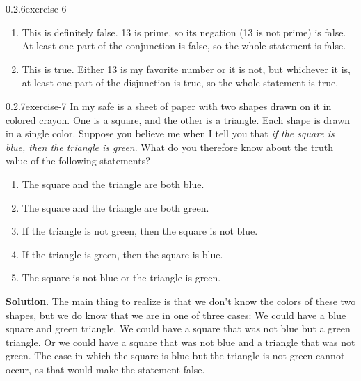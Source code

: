 \documentclass[twoside,11pt,]{book}
\numberwithin{equation}{chapter}
\begin{document}
\begin{divisionsolution}{0.2.6}{}{exercise-6}
\begin{enumerate}[label=(\alph*)]
We cannot tell. The statement would be true if 13 is my favorite number, and false if not (since a conjunction needs both parts to be true to be true).%
\item\hypertarget{li-167}{}\hypertarget{p-203}{}%
This is definitely false. 13 is prime, so its negation (13 is not prime) is false. At least one part of the conjunction is false, so the whole statement is false.%
\item\hypertarget{li-168}{}\hypertarget{p-204}{}%
This is true. Either 13 is my favorite number or it is not, but whichever it is, at least one part of the disjunction is true, so the whole statement is true.%
\end{enumerate}
%
\end{divisionsolution}%
\begin{divisionsolution}{0.2.7}{}{exercise-7}%
\hypertarget{p-217}{}%
In my safe is a sheet of paper with two shapes drawn on it in colored crayon. One is a square, and the other is a triangle. Each shape is drawn in a single color. Suppose you believe me when I tell you that \emph{if the square is blue, then the triangle is green}. What do you therefore know about the truth value of the following statements?\leavevmode%
\begin{enumerate}[label=(\alph*)]
\item\hypertarget{li-179}{}\hypertarget{p-218}{}%
The square and the triangle are both blue. %
\item\hypertarget{li-184}{}\hypertarget{p-219}{}%
The square and the triangle are both green. %
\item\hypertarget{li-189}{}\hypertarget{p-220}{}%
If the triangle is not green, then the square is not blue. %
\item\hypertarget{li-194}{}\hypertarget{p-221}{}%
If the triangle is green, then the square is blue. %
\item\hypertarget{li-199}{}\hypertarget{p-222}{}%
The square is not blue or the triangle is green. %
\end{enumerate}
%
\par\smallskip%
\noindent\textbf{Solution}.\quad%
\hypertarget{p-223}{}%
The main thing to realize is that we don't know the colors of these two shapes, but we do know that we are in one of three cases: We could have a blue square and green triangle. We could have a square that was not blue but a green triangle. Or we could have a square that was not blue and a triangle that was not green. The case in which the square is blue but the triangle is not green cannot occur, as that would make the statement false.\leavevmode%

\end{divisionsolution}
\end{document}
